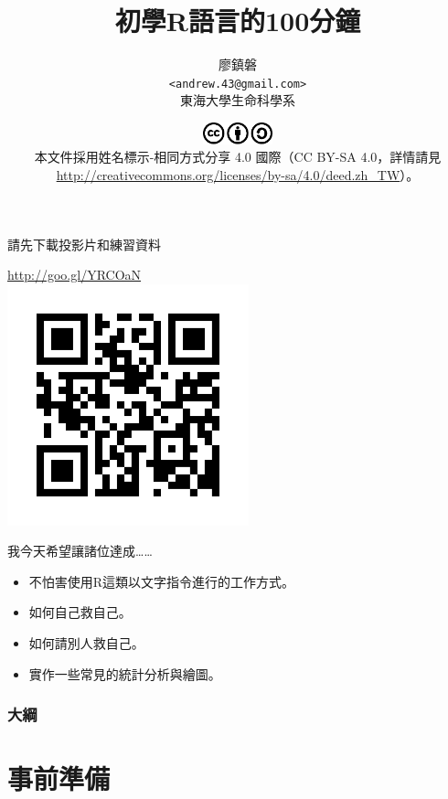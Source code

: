 \documentclass[12pt]{beamer}
\title[初學者學習R語言]{初學R語言的100分鐘}
\author[廖鎮磐]{廖鎮磐 \\ \texttt{<andrew.43@gmail.com>}\\ 東海大學生命科學系}
\institute{\normalsize 2015年台灣生態研究網年會 \\ \footnotesize 2015年3月14日於蓮華池研究中心}
\date{\scriptsize \includegraphics[width=2cm]{cc.pdf}\\
本文件採用姓名標示-相同方式分享 4.0 國際（CC BY-SA 4.0，詳情請見 \url{http://creativecommons.org/licenses/by-sa/4.0/deed.zh_TW}）。}
\begin{document}
\begin{frame}
\titlepage
\end{frame}

\begin{frame}{請先下載投影片和練習資料}
\begin{center}
\LARGE\url{http://goo.gl/YRCOaN}\\
\includegraphics[width=2.75in]{url-dropbox.pdf}
\end{center}
\end{frame}

\begin{frame}{我今天希望讓諸位達成\ldots\ldots}
\begin{itemize}
\item 不怕害使用R這類以文字指令進行的工作方式。
\item 如何自己救自己。
\item 如何請別人救自己。
\item 實作一些常見的統計分析與繪圖。
\end{itemize}
\end{frame}


\begin{frame}
\frametitle{大綱}
\tableofcontents
\end{frame}

\section{事前準備}\subsection{}
\end{document}
